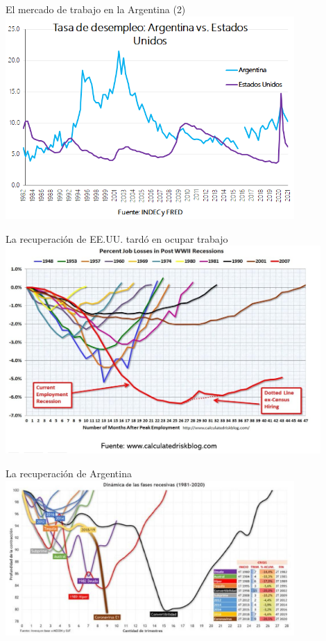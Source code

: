 \documentclass{beamer}
\begin{document}
\begin{frame}{El mercado de trabajo en la Argentina (2)}
\centering\includegraphics[width=11cm]{Figures/C30.17b.png}
\end{frame}

\begin{frame}{La recuperación de EE.UU. tardó en ocupar trabajo}
\centering\includegraphics[width=12cm]{Figures/P39.png}\
\end{frame}


\begin{frame}{La recuperación de Argentina}
\centering\includegraphics[width=11cm]{Recesiones.jpg}\
\end{frame}
\end{document}
